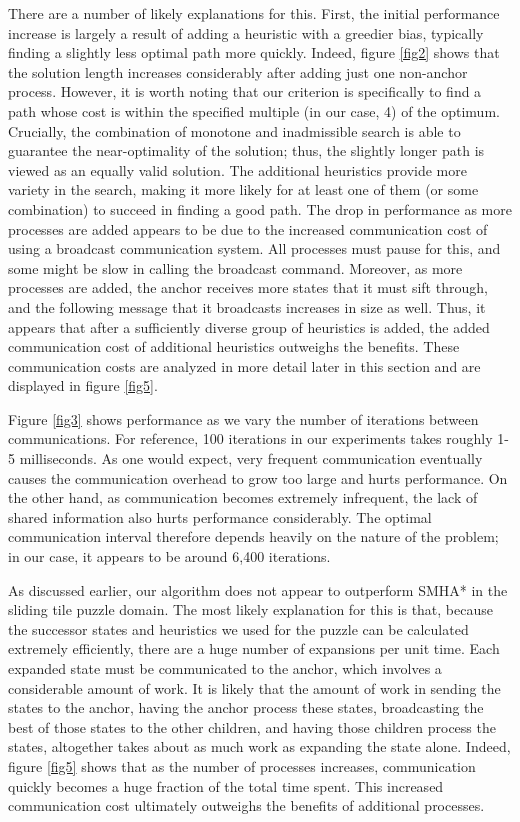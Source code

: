 \documentclass[11pt]{article}
\begin{document}
{There are a number of likely explanations for this. First, the initial performance increase is largely a result of adding a heuristic with a greedier bias, typically finding a slightly less optimal path more quickly. Indeed, figure \ref{fig2} shows that the solution length increases considerably after adding just one non-anchor process. However, it is worth noting that our criterion is specifically to find a path whose cost is within the specified multiple (in our case, 4) of the optimum. Crucially, the combination of monotone and inadmissible search is able to guarantee the near-optimality of the solution; thus, the slightly longer path is viewed as an equally valid solution. The additional heuristics provide more variety in the search, making it more likely for at least one of them (or some combination) to succeed in finding a good path. The drop in performance as more processes are added appears to be due to the increased communication cost of using a broadcast communication system. All processes must pause for this, and some might be slow in calling the broadcast command. Moreover, as more processes are added, the anchor receives more states that it must sift through, and the following message that it broadcasts increases in size as well. Thus, it appears that after a sufficiently diverse group of heuristics is added, the added communication cost of additional heuristics outweighs the benefits. These communication costs are analyzed in more detail later in this section and are displayed in figure \ref{fig5}.

Figure \ref{fig3} shows performance as we vary the number of iterations between communications. For reference, 100 iterations in our experiments takes roughly 1-5 milliseconds. As one would expect, very frequent communication eventually causes the communication overhead to grow too large and hurts performance.  On the other hand, as communication becomes extremely infrequent, the lack of shared information also hurts performance considerably. The optimal communication interval therefore depends heavily on the nature of the problem; in our case, it appears to be around 6,400 iterations.

As discussed earlier, our algorithm does not appear to outperform SMHA* in the sliding tile puzzle domain. The most likely explanation for this is that, because the successor states and heuristics we used for the puzzle can be calculated extremely efficiently, there are a huge number of expansions per unit time. Each expanded state must be communicated to the anchor, which involves a considerable amount of work. It is likely that the amount of work in sending the states to the anchor, having the anchor process these states, broadcasting the best of those states to the other children, and having those children process the states, altogether takes about as much work as expanding the state alone. Indeed, figure \ref{fig5} shows that as the number of processes increases, communication quickly becomes a huge fraction of the total time spent. This increased communication cost ultimately outweighs the benefits of additional processes.

}
\end{document}
